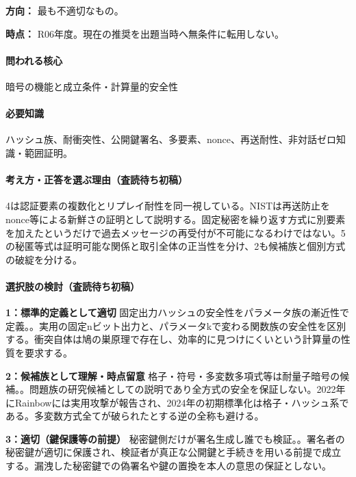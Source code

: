 \noindent\textbf{方向：} 最も不適切なもの。\par

\noindent\textbf{時点：} R06年度。現在の推奨を出題当時へ無条件に転用しない。\par

\paragraph{問われる核心} 暗号の機能と成立条件・計算量的安全性

\paragraph{必要知識} ハッシュ族、耐衝突性、公開鍵署名、多要素、nonce、再送耐性、非対話ゼロ知識・範囲証明。

\paragraph{考え方・正答を選ぶ理由（査読待ち初稿）} 4は認証要素の複数化とリプレイ耐性を同一視している。NISTは再送防止をnonce等による新鮮さの証明として説明する。固定秘密を繰り返す方式に別要素を加えたというだけで過去メッセージの再受付が不可能になるわけではない。5の秘匿等式は証明可能な関係と取引全体の正当性を分け、2も候補族と個別方式の破綻を分ける。

\paragraph{選択肢の検討（査読待ち初稿）}\mbox{}\par

\noindent\textbf{1：標準的定義として適切} 固定出力ハッシュの安全性をパラメータ族の漸近性で定義。。実用の固定nビット出力と、パラメータkで変わる関数族の安全性を区別する。衝突自体は鳩の巣原理で存在し、効率的に見つけにくいという計算量の性質を要求する。\par

\noindent\textbf{2：候補族として理解・時点留意} 格子・符号・多変数多項式等は耐量子暗号の候補。。問題族の研究候補としての説明であり全方式の安全を保証しない。2022年にRainbowには実用攻撃が報告され、2024年の初期標準化は格子・ハッシュ系である。多変数方式全てが破られたとする逆の全称も避ける。\par

\noindent\textbf{3：適切（鍵保護等の前提）} 秘密鍵側だけが署名生成し誰でも検証。。署名者の秘密鍵が適切に保護され、検証者が真正な公開鍵と手続きを用いる前提で成立する。漏洩した秘密鍵での偽署名や鍵の置換を本人の意思の保証としない。\par

